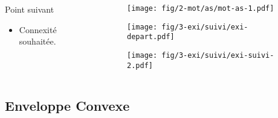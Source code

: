 \begin{frame}
\begin{columns}[t]
\begin{column}{0.6\linewidth}
{\begin{block}{Point suivant}
\begin{itemize}
          \item Connexité souhaitée.
        \end{itemize}
      \end{block} 
    }
  \end{column}
  \begin{column}{0.4\linewidth}
    {
      \begin{figure}[h!]
        \centering
        \texttt{[image: fig/2-mot/as/mot-as-1.pdf]}
      \end{figure}    
    }
    {
      \begin{figure}[h!]
        \centering
        \texttt{[image: fig/3-exi/suivi/exi-depart.pdf]}
      \end{figure}    
    }
    {  
      \begin{figure}[h!]
        \centering
        \texttt{[image: fig/3-exi/suivi/exi-suivi-2.pdf]}
      \end{figure}  
    }
  \end{column}
\end{columns}





\end{frame}

\subsection{Enveloppe Convexe}

